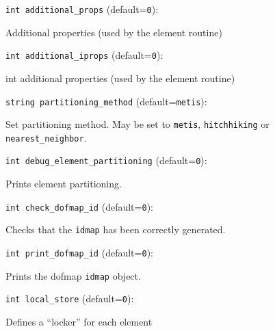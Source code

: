 \item\verb+int additional_props+ {\rm(default=\verb|0|)}:

Additional properties (used by the element routine)

\item\verb+int additional_iprops+ {\rm(default=\verb|0|)}:

int additional properties (used by the element routine)

\item\verb+string partitioning_method+ {\rm(default=\verb|metis|)}:

Set partitioning method. May be set to \verb+metis+,
\verb+hitchhiking+ or \verb+nearest_neighbor+.

\item\verb+int debug_element_partitioning+ {\rm(default=\verb|0|)}:

Prints element partitioning. 

\item\verb+int check_dofmap_id+ {\rm(default=\verb|0|)}:

Checks that the \verb+idmap+ has been correctly generated. 

\item\verb+int print_dofmap_id+ {\rm(default=\verb|0|)}:

Prints the dofmap \verb+idmap+ object. 

\item\verb+int local_store+ {\rm(default=\verb|0|)}:

Defines a ``locker'' for each element

